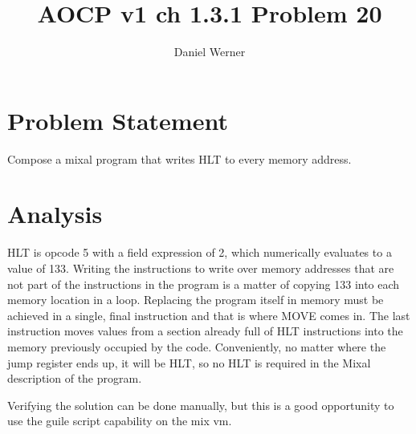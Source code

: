 \documentclass{article}
\title{AOCP v1 ch 1.3.1 Problem 20}
\author{Daniel Werner}
\begin{document}
\maketitle

\section*{
    Problem Statement
}

Compose a mixal program that writes HLT to every memory address.

\section*{
    Analysis
}

HLT is opcode 5 with a field expression of 2, which numerically evaluates to a value of 133.
Writing the instructions to write over memory addresses that are not part of the instructions
in the program is a matter of copying 133 into each memory location in a loop.  Replacing the
program itself in memory must be achieved in a single, final instruction and that is where
MOVE comes in.  The last instruction moves values from a section already full of HLT
instructions into the memory previously occupied by the code.  Conveniently, no matter where
the jump register ends up, it will be HLT, so no HLT is required in the Mixal description of
the program.

\par

Verifying the solution can be done manually, but this is a good
opportunity to use the guile script capability on the mix vm.
\end{document}
